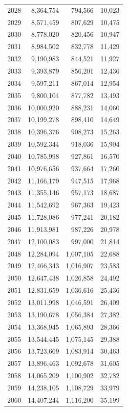 \documentclass[11pt]{article}
\begin{document}
\begin{longtable}{@{}lrrr@{}}
2028 & 8,364,754 & 794,566 & 10,023\\
2029 & 8,571,459 & 807,629 & 10,475\\
2030 & 8,778,020 & 820,456 & 10,947\\
2031 & 8,984,502 & 832,778 & 11,429\\
2032 & 9,190,983 & 844,521 & 11,927\\
2033 & 9,393,879 & 856,201 & 12,436\\
2034 & 9,597,211 & 867,014 & 12,954\\
2035 & 9,800,104 & 877,782 & 13,493\\
2036 & 10,000,920 & 888,231 & 14,060\\
2037 & 10,199,278 & 898,410 & 14,649\\
2038 & 10,396,376 & 908,273 & 15,263\\
2039 & 10,592,344 & 918,036 & 15,904\\
2040 & 10,785,998 & 927,861 & 16,570\\
2041 & 10,976,656 & 937,664 & 17,260\\
2042 & 11,166,179 & 947,515 & 17,968\\
2043 & 11,355,146 & 957,173 & 18,687\\
2044 & 11,542,692 & 967,363 & 19,423\\
2045 & 11,728,086 & 977,241 & 20,182\\
2046 & 11,913,981 & 987,226 & 20,978\\
2047 & 12,100,083 & 997,000 & 21,814\\
2048 & 12,284,094 & 1,007,105 & 22,688\\
2049 & 12,466,343 & 1,016,907 & 23,583\\
2050 & 12,647,438 & 1,026,858 & 24,492\\
2051 & 12,831,659 & 1,036,616 & 25,436\\
2052 & 13,011,998 & 1,046,591 & 26,409\\
2053 & 13,190,678 & 1,056,384 & 27,382\\
2054 & 13,368,945 & 1,065,893 & 28,366\\
2055 & 13,544,445 & 1,075,145 & 29,388\\
2056 & 13,723,669 & 1,083,914 & 30,463\\
2057 & 13,896,463 & 1,092,678 & 31,605\\
2058 & 14,065,209 & 1,100,902 & 32,782\\
2059 & 14,238,105 & 1,108,729 & 33,979\\
2060 & 14,407,244 & 1,116,200 & 35,199\\

\end{longtable}
\end{document}
